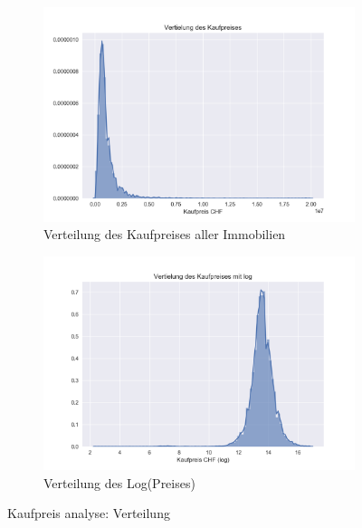 \begin{figure}[ht]
\begin{subfigure}{.5\textwidth}
  \centering
  \includegraphics[width=\linewidth]{images/Verteilung_des_kauf_preises.png}
  \caption[Verteilung des Kaufpreises aller Immobilien]{Verteilung des Kaufpreises aller Immobilien}
  \label{fig:price_normal}
\end{subfigure}%
\begin{subfigure}{.5\textwidth}
  \centering
  \includegraphics[width=\linewidth]{images/Verteilung_des_kauf_preises_log.png}
  \caption[Verteilung des Log(Preises)]{Verteilung des Log(Preises)}
  \label{fig:price_log}
\end{subfigure}
\caption[Kaufpreis analyse: Verteilung]{Kaufpreis analyse: Verteilung}
\label{fig:price}
\end{figure}
%
\begin{table}[ht]
\centering
{}
\caption{Fehlermodelle mit Formelen}
\label{tab:error_models}
\end{table}
%
